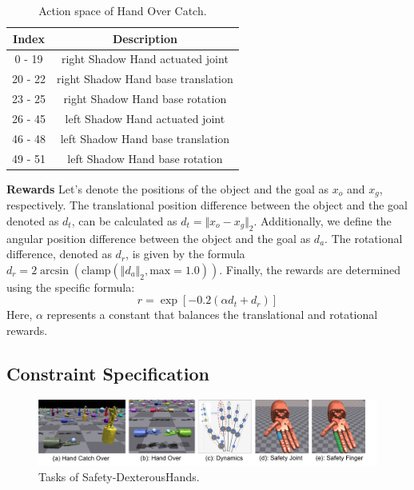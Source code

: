 \documentclass{article}
\begin{document}
\begin{table}[htbp]
    \centering
    \caption{Action space of Hand Over Catch.}
    \begin{tabular}{c|c}
    \toprule
    Index&Description\\\hline
    0 - 19&	right Shadow Hand actuated joint\\\hline
    20 - 22&	right Shadow Hand base translation\\\hline
    23 - 25&	right Shadow Hand base rotation\\\hline
    26 - 45&	left Shadow Hand actuated joint\\\hline
    46 - 48&	left Shadow Hand base translation\\\hline
    49 - 51&	left Shadow Hand base rotation\\
    \bottomrule
    \end{tabular}
    \label{catch_over2underarm_action}
\end{table}

\textbf{Rewards} Let's denote the positions of the object and the goal as $x_o$ and $x_g$, respectively. The translational position difference between the object and the goal denoted as $d_t$, can be calculated as $d_t = \Vert x_o - x_g \Vert_2$. Additionally, we define the angular position difference between the object and the goal as $d_a$. The rotational difference, denoted as $d_r$, is given by the formula $d_r = 2\arcsin(\text{{clamp}}(\Vert d_a \Vert_2, \text{{max}} = 1.0))$. Finally, the rewards are determined using the specific formula:
\begin{equation}
r = \exp[-0.2(\alpha d_t + d_r)]
\end{equation}
Here, $\alpha$ represents a constant that balances the translational and rotational rewards.

\subsection{Constraint Specification}
\begin{figure}[ht]
  \centering
  \includegraphics[width=\linewidth]{assets/main-paper/issac-gym-hand.pdf}
  \caption{Tasks of Safety-DexterousHands.}
  \label{apppic: dexterous-hand}
\end{figure}
\end{document}
